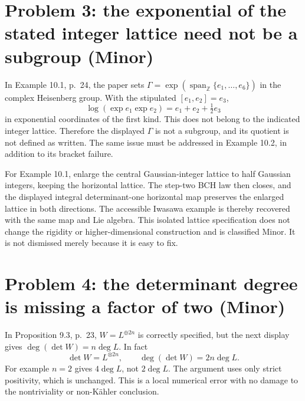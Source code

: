 \documentclass[10pt]{article}
\begin{document}
\section*{Problem 3: the exponential of the stated integer lattice need not be a subgroup (Minor)}
In Example 10.1, p. 24, the paper sets \(\Gamma=\exp(\operatorname{span}_{\mathbb Z}\{e_1,\ldots,e_6\})\) in the complex Heisenberg group. With the stipulated \([e_1,e_2]=e_3\), \[\log(\exp e_1\exp e_2)=e_1+e_2+\tfrac12e_3\] in exponential coordinates of the first kind. This does not belong to the indicated integer lattice. Therefore the displayed \(\Gamma\) is not a subgroup, and its quotient is not defined as written. The same issue must be addressed in Example 10.2, in addition to its bracket failure.\par
For Example 10.1, enlarge the central Gaussian-integer lattice to half Gaussian integers, keeping the horizontal lattice. The step-two BCH law then closes, and the displayed integral determinant-one horizontal map preserves the enlarged lattice in both directions. The accessible Iwasawa example is thereby recovered with the same map and Lie algebra. This isolated lattice specification does not change the rigidity or higher-dimensional construction and is classified Minor. It is not dismissed merely because it is easy to fix.\par
\section*{Problem 4: the determinant degree is missing a factor of two (Minor)}
In Proposition 9.3, p. 23, \(W=L^{\oplus 2n}\) is correctly specified, but the next display gives \(\deg(\det W)=n\deg L\). In fact \[\det W=L^{\otimes 2n},\qquad \deg(\det W)=2n\deg L.\] For example \(n=2\) gives \(4\deg L\), not \(2\deg L\). The argument uses only strict positivity, which is unchanged. This is a local numerical error with no damage to the nontriviality or non-Kähler conclusion.\par
\end{document}
